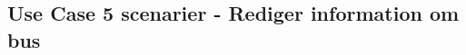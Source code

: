\documentclass[Main.tex]{subfiles}
\begin{document}
\subsection{Use Case 5 scenarier - Rediger information om bus}
\end{document}
